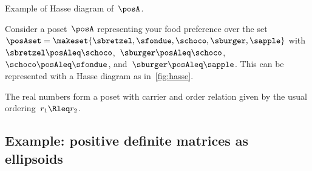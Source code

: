 \begin{marginfigure}
    \centering
    \caption{Example of Hasse diagram of~$\posA$.}
    \label{fig:hasse}
\end{marginfigure}
\begin{example}
    Consider a poset~$\posA$ representing your food preference over the set~$\posAset=\makeset{\sbretzel,\sfondue,\schoco,\sburger,\sapple}$ with~$\sbretzel\posAleq \schoco$,~$\sburger\posAleq \schoco$,~$\schoco\posAleq \sfondue$, and~$\sburger\posAleq \sapple$.
    This can be represented with a Hasse diagram as in~\cref{fig:hasse}.
\end{example}

\begin{example}[Reals]
    The real numbers \reals form a poset with carrier \reals and order relation given by the usual ordering~$r_1 \Rleq r_2$.
\end{example}

\vfill\clearpage

\subsection{Example: positive definite matrices as ellipsoids}

\begin{marginfigure}
    \centering

    \caption{}
    \label{fig:posdef}
\end{marginfigure}

